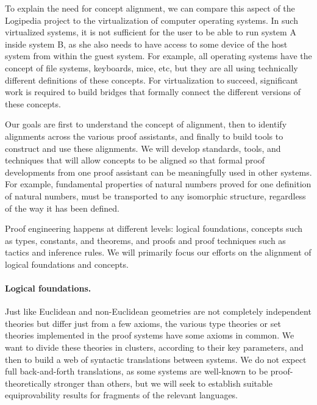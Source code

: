 To explain the need for concept alignment, we can compare this aspect
of the Logipedia project to the virtualization of computer operating
systems. In such virtualized systems, it is not sufficient for the
user to be able to run system A inside system B, as she also needs to
have access to some device of the host system from within the guest
system. For example, all operating systems have the concept of file
systems, keyboards, mice, etc, but they are all using technically
different definitions of these concepts.  For virtualization to
succeed, significant work is required to build bridges that formally
connect the different versions of these concepts.

Our goals are first to understand the concept of alignment, then to
identify alignments across the various proof assistants, and finally
to build tools to construct and use these alignments. We will develop
standards, tools, and techniques that will allow concepts to be
aligned so that formal proof developments from one proof assistant can
be meaningfully used in other systems. For example, fundamental
properties of natural numbers proved for one definition of natural
numbers, must be transported to any isomorphic structure, regardless
of the way it has been defined.

Proof engineering happens at different levels: logical foundations,
concepts such as types, constants, and theorems, and proofs and proof
techniques such as tactics and inference rules. We will primarily
focus our efforts on the alignment of logical foundations and
concepts.

\newcommand{\parag}[1]{\medskip \noindent {\bf #1}}

\paragraph*{Logical foundations.}
Just like Euclidean and non-Euclidean geometries are not completely
independent theories but differ just from a few axioms, the various
type theories or set theories implemented in the proof systems have
some axioms in common.  We want to divide these theories in clusters,
according to their key parameters, and then to build a web of
syntactic translations between systems. We do not expect full
back-and-forth translations, as some systems are well-known to be
proof-theoretically stronger than others, but we will seek to
establish suitable equiprovability results for fragments of the
relevant languages.

